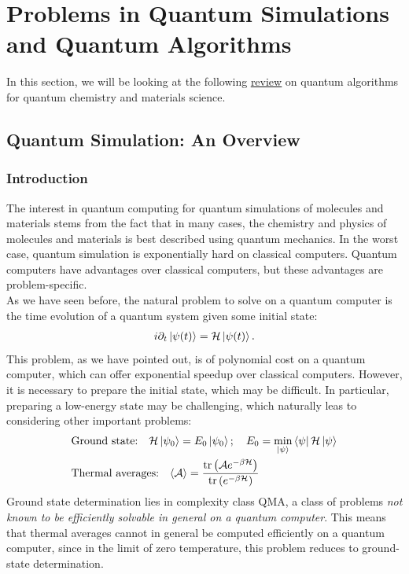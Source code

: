 \documentclass{book}
\theoremstyle{definition}
\newcommand{\p}{\partial}
\newcommand{\had}{\mathcal{H}}
\newcommand{\f}[2]{\frac{#1}{#2}}
\newcommand{\lp}{\left(}
\newcommand{\rp}{\right)}
\begin{document}
\newpage


\section{Problems in Quantum Simulations and Quantum Algorithms}

In this section, we will be looking at the following \href{https://arxiv.org/pdf/2001.03685.pdf}{\underline{review}} on quantum algorithms for quantum chemistry and materials science. 

\subsection{Quantum Simulation: An Overview}

\subsubsection{Introduction}

The interest in quantum computing for quantum simulations of molecules and materials stems from the fact that in many cases, the chemistry and physics of molecules and materials is best described using quantum mechanics. In the worst case, quantum simulation is exponentially hard on classical computers. Quantum computers have advantages over classical computers, but these advantages are problem-specific. \\


As we have seen before, the natural problem to solve on a quantum computer is the time evolution of a quantum system given some initial state:
\begin{align}
i\p_t \ket{\psi(t)} = \had \ket{\psi(t)}.
\end{align}
This problem, as we have pointed out, is of polynomial cost on a quantum computer, which can offer exponential speedup over classical computers. However, it is necessary to prepare the initial state, which may be difficult. In particular, preparing a low-energy state may be challenging, which naturally leas to considering other important problems:
\begin{align}
&\mbox{Ground state:} \quad \had\ket{\psi_0} = E_0 \ket{\psi_0}; \quad E_0 = \min_{\ket{\psi}}\bra{\psi}\had\ket{\psi}\\
&\mbox{Thermal averages:} \quad \langle \mathcal{A} \rangle = \f{\tr\lp \mathcal{A}e^{-\beta\had} \rp}{\tr\lp e^{-\beta\had} \rp}
\end{align} 
Ground state determination lies in complexity class QMA, a class of problems \textit{not known to be efficiently solvable in general on a quantum computer}. This means that thermal averages cannot in general be computed efficiently on a quantum computer, since in the limit of zero temperature, this problem reduces to ground-state determination. \\
\end{document}
